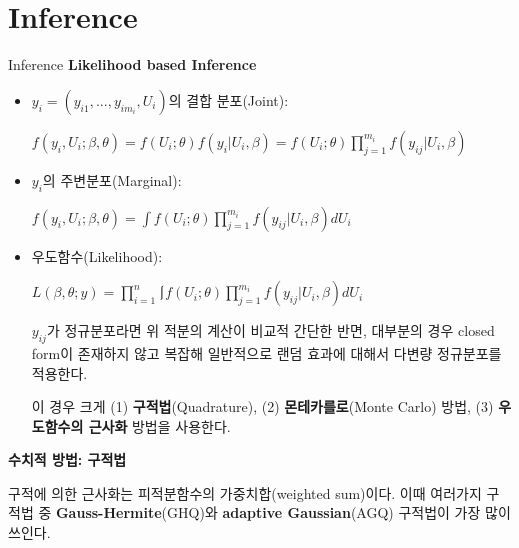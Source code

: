 \documentclass[9pt, xelatex]{beamer}
\begin{document}
\section{Inference}{
		\begin{frame}[allowframebreaks]{Inference}
		\textbf{Likelihood based Inference}
		\vspace{4mm}
		
		\begin{itemize}
		\item $y_{i}=(y_{i1},...,y_{im_{i}}, U_{i})$의 결합 분포(Joint):
		
		\begin{center}
			$f(y_{i},U_{i};\beta,\theta)=f(U_{i};\theta)f(y_{i}|U_{i},\beta)=f(U_{i};\theta)\prod_{j=1}^{m_{i}} f(y_{ij}|U_{i},\beta)$
		\end{center}
		\vspace{2mm}
	
		\item $y_{i}$의 주변분포(Marginal):
		
		\begin{center}
			$f(y_{i},U_{i};\beta,\theta)=\int f(U_{i};\theta)\prod_{j=1}^{m_{i}} f(y_{ij}|U_{i},\beta)dU_{i}$
		\end{center}
	\vspace{2mm}
	
		\item 우도함수(Likelihood):
		
		\begin{center}
			$L(\beta,\theta; y)=\prod_{i=1}^{n}\lmoustache f(U_{i};\theta)\prod_{j=1}^{m_{i}} f(y_{ij}|U_{i},\beta)dU_{i}$	
		\end{center}
	
	\vspace{2mm}
	
	$y_{ij}$가 정규분포라면 위 적분의 계산이 비교적 간단한 반면, 대부분의 경우 closed form이 존재하지 않고 복잡해 일반적으로 랜덤 효과에 대해서 다변량 정규분포를 적용한다.
	\vspace{2mm}
	
	이 경우 크게 (1) \textbf{구적법}(Quadrature), (2) \textbf{몬테카를로}(Monte Carlo) 방법, (3) \textbf{우도함수의 근사화} 방법을 사용한다.
		\end{itemize}
	
		\pagebreak
		\textbf{수치적 방법: 구적법}
		\vspace{4mm}
		
		구적에 의한 근사화는 피적분함수의 가중치합(weighted sum)이다. 이때 여러가지 구적법 중 \textbf{Gauss-Hermite}(GHQ)와 \textbf{adaptive Gaussian}(AGQ) 구적법이 가장 많이 쓰인다.
		\vspace{2mm}
		

\end{frame}}
\end{document}
